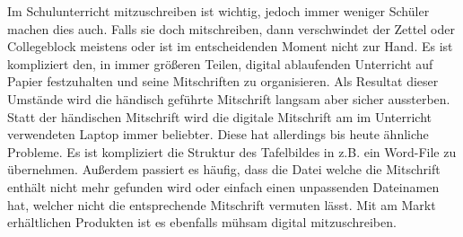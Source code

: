 
Im Schulunterricht mitzuschreiben ist wichtig, jedoch immer weniger Schüler machen dies auch. Falls sie doch mitschreiben, dann verschwindet der Zettel oder Collegeblock meistens oder ist im entscheidenden Moment nicht zur Hand. Es ist kompliziert den, in immer größeren Teilen, digital ablaufenden Unterricht auf Papier festzuhalten und seine Mitschriften zu organisieren. Als Resultat dieser Umstände wird die händisch geführte Mitschrift langsam aber sicher aussterben. \\

Statt der händischen Mitschrift wird die digitale Mitschrift am im Unterricht verwendeten Laptop immer beliebter. Diese hat allerdings bis heute ähnliche Probleme. Es ist kompliziert die Struktur des Tafelbildes in z.B. ein Word-File zu übernehmen. Außerdem passiert es häufig, dass die Datei welche die Mitschrift enthält nicht mehr gefunden wird oder einfach einen unpassenden Dateinamen hat, welcher nicht die entsprechende Mitschrift vermuten lässt. Mit am Markt erhältlichen Produkten ist es ebenfalls mühsam digital mitzuschreiben.